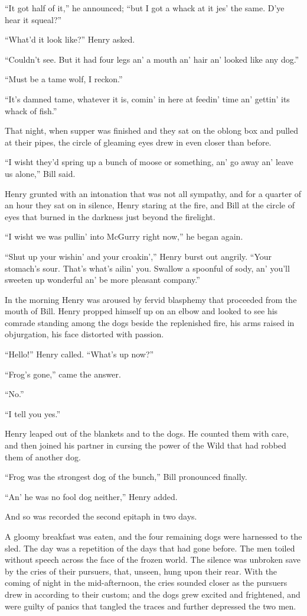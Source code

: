 \documentclass[10pt]{book}
\begin{document}
“It got half of it,” he announced; “but I got a whack at it jes’ the
same. D’ye hear it squeal?”

“What’d it look like?” Henry asked.

“Couldn’t see. But it had four legs an’ a mouth an’ hair an’ looked
like any dog.”

“Must be a tame wolf, I reckon.”

“It’s damned tame, whatever it is, comin’ in here at feedin’ time an’
gettin’ its whack of fish.”

That night, when supper was finished and they sat on the oblong box and
pulled at their pipes, the circle of gleaming eyes drew in even closer
than before.

“I wisht they’d spring up a bunch of moose or something, an’ go away
an’ leave us alone,” Bill said.

Henry grunted with an intonation that was not all sympathy, and for a
quarter of an hour they sat on in silence, Henry staring at the fire,
and Bill at the circle of eyes that burned in the darkness just beyond
the firelight.

“I wisht we was pullin’ into McGurry right now,” he began again.

“Shut up your wishin’ and your croakin’,” Henry burst out angrily.
“Your stomach’s sour. That’s what’s ailin’ you. Swallow a spoonful of
sody, an’ you’ll sweeten up wonderful an’ be more pleasant company.”

In the morning Henry was aroused by fervid blasphemy that proceeded
from the mouth of Bill. Henry propped himself up on an elbow and looked
to see his comrade standing among the dogs beside the replenished fire,
his arms raised in objurgation, his face distorted with passion.

“Hello!” Henry called. “What’s up now?”

“Frog’s gone,” came the answer.

“No.”

“I tell you yes.”

Henry leaped out of the blankets and to the dogs. He counted them with
care, and then joined his partner in cursing the power of the Wild that
had robbed them of another dog.

“Frog was the strongest dog of the bunch,” Bill pronounced finally.

“An’ he was no fool dog neither,” Henry added.

And so was recorded the second epitaph in two days.

A gloomy breakfast was eaten, and the four remaining dogs were
harnessed to the sled. The day was a repetition of the days that had
gone before. The men toiled without speech across the face of the
frozen world. The silence was unbroken save by the cries of their
pursuers, that, unseen, hung upon their rear. With the coming of night
in the mid-afternoon, the cries sounded closer as the pursuers drew in
according to their custom; and the dogs grew excited and frightened,
and were guilty of panics that tangled the traces and further depressed
the two men.
\end{document}
